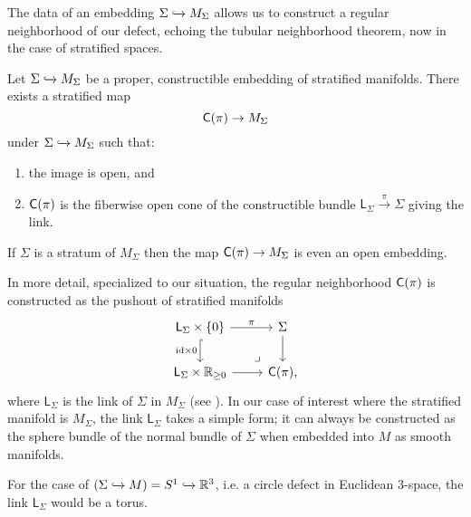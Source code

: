 \documentclass[../text.tex]{subfiles}
\begin{document}
The data of an embedding $\Sigma \xhookrightarrow{} M_\Sigma$ allows us to construct a regular neighborhood of our defect, echoing the tubular neighborhood theorem, now in the case of stratified spaces.
%
\begin{theorem}
    Let $\Sigma \xhookrightarrow{} M_\Sigma$ be a proper, constructible embedding of stratified manifolds. There exists a stratified map
    \begin{equation}
        \cone(\pi) \rightarrow M_\Sigma
    \end{equation}
    under $\Sigma \xhookrightarrow{} M_\Sigma$ such that:
    \begin{enumerate}
        \item the image is open, and
        \item $\cone(\pi)$ is the fiberwise open cone of the constructible bundle $\mathsf{L}_{\Sigma} \xrightarrow{\pi} \Sigma$ giving the link.
    \end{enumerate}
    If $\Sigma$ is a stratum of $M_\Sigma$ then the map $\cone(\pi) \rightarrow M_\Sigma$ is even an open embedding.
\end{theorem}

\begin{remark}
    In more detail, specialized to our situation, the regular neighborhood $\cone(\pi)$ is constructed as the pushout of stratified manifolds
    \begin{equation}
        \begin{tikzcd}
            \mathsf{L}_{\Sigma} \times \{0\} \arrow[r, "\pi"] \arrow[d, "\mathrm{id} \times 0"', hook] & \Sigma \arrow[d] \\
            \mathsf{L}_{\Sigma} \times \hoint \arrow[r] & \cone(\pi) \arrow[ul, phantom, "\lrcorner", very near start],
        \end{tikzcd}
    \end{equation}
    where $\mathsf{L}_{\Sigma}$ is the link of $\Sigma$ in $M_{\Sigma}$ (see \cite{aft_localstrut}). In our case of interest where the stratified manifold is $M_{\Sigma}$, the link $\mathsf{L}_{\Sigma}$ takes a simple form; it can always be constructed as the sphere bundle of the normal bundle of $\Sigma$ when embedded into $M$ as smooth manifolds.
\end{remark}

\begin{example}
    For the case of $(\Sigma \xhookrightarrow{} M) = {S^1 \xhookrightarrow{} \mathbb{R}^3}$, i.e. a circle defect in Euclidean 3-space, the link $\mathsf{L}_{\Sigma}$ would be a torus.
\end{example}
\end{document}
